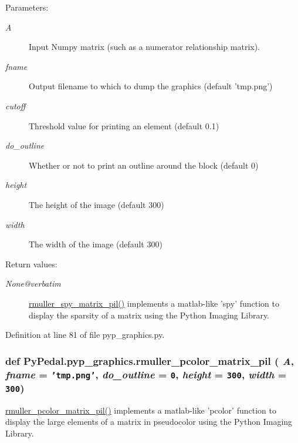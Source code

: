 \begin{Desc}
\item[Parameters:]
\begin{description}
\item[{\em A}]Input Numpy matrix (such as a numerator relationship matrix). \item[{\em fname}]Output filename to which to dump the graphics (default 'tmp.png') \item[{\em cutoff}]Threshold value for printing an element (default 0.1) \item[{\em do\_\-outline}]Whether or not to print an outline around the block (default 0) \item[{\em height}]The height of the image (default 300) \item[{\em width}]The width of the image (default 300) \end{description}
\end{Desc}
\begin{Desc}
\item[Return values:]
\begin{description}
\item[{\em None@verbatim}]\hyperlink{namespacePyPedal_1_1pyp__graphics_025ff5088109e49fc7936da00a433d60}{rmuller\_\-spy\_\-matrix\_\-pil()} implements a matlab-like 'spy' function to display the sparsity of a matrix using the Python Imaging Library.  \end{description}
\end{Desc}


Definition at line 81 of file pyp\_\-graphics.py.\hypertarget{namespacePyPedal_1_1pyp__graphics_b89e2534bdd5f0e0e57778f11e056007}{
\subsubsection[rmuller\_\-pcolor\_\-matrix\_\-pil]{\setlength{\rightskip}{0pt plus 5cm}def Py\-Pedal.pyp\_\-graphics.rmuller\_\-pcolor\_\-matrix\_\-pil ( {\em A},  {\em fname} = {\tt 'tmp.png'},  {\em do\_\-outline} = {\tt 0},  {\em height} = {\tt 300},  {\em width} = {\tt 300})}}
\label{namespacePyPedal_1_1pyp__graphics_b89e2534bdd5f0e0e57778f11e056007}


\hyperlink{namespacePyPedal_1_1pyp__graphics_b89e2534bdd5f0e0e57778f11e056007}{rmuller\_\-pcolor\_\-matrix\_\-pil()} implements a matlab-like 'pcolor' function to display the large elements of a matrix in pseudocolor using the Python Imaging Library. 

